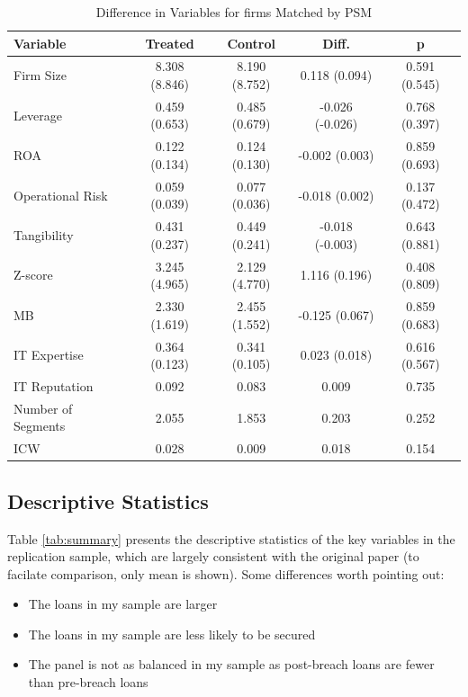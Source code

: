 \documentclass[11pt]{article}
\begin{document}
\begin{table}[ht]
  \centering
  \scriptsize
  \begin{tabular}{@{}lcccc@{}}
    \toprule
    Variable           & Treated       & Control       & Diff.           & p             \\
    \midrule
    Firm Size          & 8.308 (8.846) & 8.190 (8.752) & 0.118 (0.094)   & 0.591 (0.545) \\
    Leverage           & 0.459 (0.653) & 0.485 (0.679) & -0.026 (-0.026) & 0.768 (0.397) \\
    ROA                & 0.122 (0.134) & 0.124 (0.130) & -0.002 (0.003)  & 0.859 (0.693) \\
    Operational Risk   & 0.059 (0.039) & 0.077 (0.036) & -0.018 (0.002)  & 0.137 (0.472) \\
    Tangibility        & 0.431 (0.237) & 0.449 (0.241) & -0.018 (-0.003) & 0.643 (0.881) \\
    Z-score            & 3.245 (4.965) & 2.129 (4.770) & 1.116 (0.196)   & 0.408 (0.809) \\
    MB                 & 2.330 (1.619) & 2.455 (1.552) & -0.125 (0.067)  & 0.859 (0.683) \\
    IT Expertise       & 0.364 (0.123) & 0.341 (0.105) & 0.023 (0.018)   & 0.616 (0.567) \\
    IT Reputation      & 0.092         & 0.083         & 0.009           & 0.735         \\
    Number of Segments & 2.055         & 1.853         & 0.203           & 0.252         \\
    ICW                & 0.028         & 0.009         & 0.018           & 0.154         \\
    \bottomrule
  \end{tabular}
  \label{tab:diff}
  \caption{Difference in Variables for firms Matched by PSM}
\end{table}

\subsection{Descriptive Statistics}
Table \ref{tab:summary} presents the descriptive statistics of the key variables in the replication sample, which are largely consistent with the original paper (to facilate comparison, only mean is shown). Some differences worth pointing out: \begin{itemize}
  \item The loans in my sample are larger
  \item The loans in my sample are less likely to be secured
  \item The panel is not as balanced in my sample as post-breach loans are fewer than pre-breach loans
\end{itemize}
\end{document}

